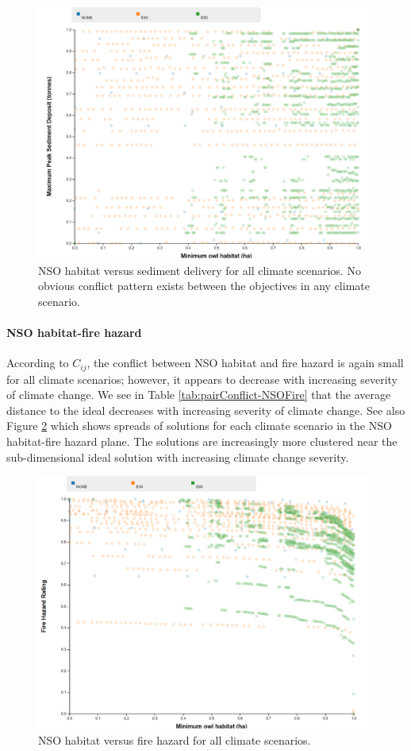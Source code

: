 \begin{figure}[ht]
\centering
\includegraphics[width=.75\textwidth]{../images/2DSlice_NSO_Sed}
\caption[NSO habitat vs. sediment delivery for all climate scenarios]{NSO habitat versus sediment delivery for all climate scenarios. No obvious conflict pattern exists between the objectives in any climate scenario.}
\label{fig:pairplotNSOSed}
\end{figure}

\paragraph{NSO habitat-fire hazard}
According to $C_{ij}$, the conflict between NSO habitat and fire hazard is again small for all climate scenarios; however, it appears to decrease with increasing severity of climate change. We see in Table \ref{tab:pairConflict-NSOFire} that the average distance to the ideal decreases with increasing severity of climate change. See also Figure \ref{fig:pairplotNSOFire} which shows spreads of solutions for each climate scenario in the NSO habitat-fire hazard plane. The solutions are increasingly more clustered near the sub-dimensional ideal solution with increasing climate change severity.

\begin{figure}[ht]
\centering
\includegraphics[width=.75\textwidth]{../images/2DSlice_NSO_Fire}
\caption[NSO habitat vs. fire hazard for all climate scenarios]{NSO habitat versus fire hazard for all climate scenarios.}
\label{fig:pairplotNSOFire}
\end{figure}

